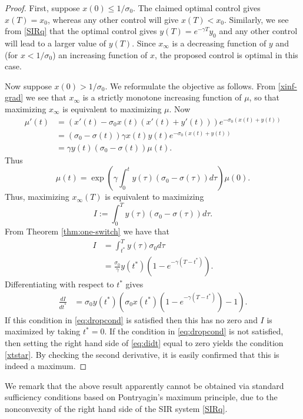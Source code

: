 \documentclass[english,12pt,letter]{article}
\newcommand{\Rnot}{\sigma_0}
\newcommand{\Sinf}{x_\infty}
\begin{document}
\begin{proof}
First, suppose $x(0)\le1/\sigma_0$.  The claimed optimal control gives $x(T)=x_0$, whereas
any other control will give $x(T)<x_0$.  Similarly, we see from \eqref{SIRq} that
the optimal control gives $y(T)=e^{-\gamma T}y_0$ and any other control will
lead to a larger value of $y(T)$.  Since $\Sinf$ is a decreasing function of $y$ and
(for $x<1/\Rnot$) an increasing function of $x$, the proposed control is optimal in this case.

Now suppose $x(0)>1/\sigma_0$.  We reformulate the objective as follows.
From \eqref{xinf-grad} we see that $\Sinf$ is a strictly monotone increasing function of $\mu$,
so that maximizing $\Sinf$ is equivalent to maximizing $\mu$. Now
\begin{align*}
    \mu'(t) & = (x'(t)-\Rnot x(t)(x'(t)+y'(t)))e^{-\Rnot(x(t)+y(t))} \\
            & = (\Rnot - \sigma(t))\gamma x(t) y(t) e^{-\Rnot(x(t)+y(t))} \\
            & = \gamma y(t) (\Rnot-\sigma(t))\mu(t).
\end{align*}
Thus
$$
    \mu(t) = \exp\left(\gamma \int_0^t y(\tau) (\Rnot-\sigma(\tau)) d\tau\right) \mu(0).
$$
Thus, maximizing $\Sinf(T)$ is equivalent to maximizing
$$
    I := \int_0^T y(\tau) (\Rnot-\sigma(\tau)) d\tau.
$$
From Theorem \ref{thm:one-switch} we have that
\begin{align*}
    I & = \int_{t^*}^T y(\tau) \Rnot d\tau \\
      & = \frac{\Rnot}{\gamma} y(t^*) \left(1-e^{-\gamma(T-t^*)}\right).
\end{align*}
Differentiating with respect to $t^*$ gives
\begin{align} \label{eq:didt}
    \frac{d I}{dt^*} & = \Rnot y(t^*)\left( \Rnot x(t^*)(1-e^{-\gamma(T-t^*)}) - 1 \right).
\end{align}
If this condition in \eqref{eq:dropcond} is satisfied then this has no
zero and $I$ is maximized by taking $t^*=0$.  If the condition in
\eqref{eq:dropcond} is not satisfied, then setting the right hand side
of \eqref{eq:didt} equal to zero yields the condition \eqref{xtstar}.
By checking the second derivative, it is easily confirmed that this
is indeed a maximum.
\end{proof}

We remark that the above result apparently cannot be obtained via standard
sufficiency conditions based on Pontryagin's maximum principle, due to the
nonconvexity of the right hand side of the SIR system \eqref{SIRq}.
\end{document}
